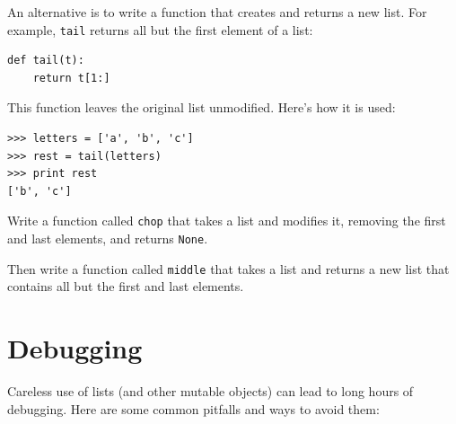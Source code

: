 \documentclass[10pt]{book}
\begin{document}

An alternative is to write a function that creates and
returns a new list.  For
example, {\tt tail} returns all but the first
element of a list:

\beforeverb
\begin{verbatim}
def tail(t):
    return t[1:]
\end{verbatim}
\afterverb
%
This function leaves the original list unmodified.
Here's how it is used:

\beforeverb
\begin{verbatim}
>>> letters = ['a', 'b', 'c']
>>> rest = tail(letters)
>>> print rest
['b', 'c']
\end{verbatim}
\afterverb


\begin{ex}

Write a function called {\tt chop} that takes a list and modifies
it, removing the first and last elements, and returns {\tt None}.

Then write a function called {\tt middle} that takes a list and
returns a new list that contains all but the first and last
elements.

\end{ex}


\section{Debugging}

Careless use of lists (and other mutable objects)
can lead to long hours of debugging.  Here are some common
pitfalls and ways to avoid them:
\end{document}
